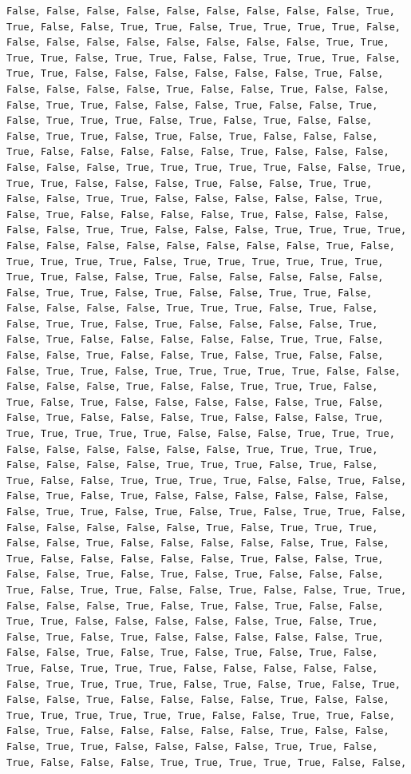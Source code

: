 \documentclass[
  letterpaper,
  DIV=11,
  numbers=noendperiod]{scrartcl}
\begin{document}
\begin{verbatim}
False, False, False, False, False, False, False, False, False, True, True, False, False, True, True, False, True, True, True, True, False, False, False, False, False, False, False, False, False, True, True, True, True, False, True, True, False, False, True, True, True, False, True, True, False, False, False, False, False, False, True, False, False, False, False, False, True, False, False, True, False, False, False, True, True, False, False, False, True, False, False, True, False, True, True, True, False, True, False, True, False, False, False, True, True, False, True, False, True, False, False, False, True, False, False, False, False, False, True, False, False, False, False, False, False, True, True, True, True, True, False, False, True, True, True, False, False, False, True, False, False, True, True, False, False, True, True, False, False, False, False, False, True, False, True, False, False, False, False, True, False, False, False, False, False, True, True, False, False, False, True, True, True, True, False, False, False, False, False, False, False, False, True, False, True, True, True, True, False, True, True, True, True, True, True, True, True, False, False, True, False, False, False, False, False, False, True, True, False, True, False, False, True, True, False, False, False, False, False, True, True, True, False, True, False, False, True, True, False, True, False, False, False, False, True, False, True, False, False, False, False, False, True, True, False, False, False, True, False, False, True, False, True, False, False, False, True, True, False, True, True, True, True, True, False, False, False, False, False, True, False, False, True, True, True, False, True, False, True, False, False, False, False, False, True, False, False, True, False, False, False, True, False, False, False, True, True, True, True, True, True, False, False, False, True, True, True, False, False, False, False, False, False, True, True, True, True, False, False, False, False, True, True, True, False, True, False, True, False, False, True, True, True, True, False, False, True, False, False, True, False, True, False, False, False, False, False, False, False, True, True, False, True, False, True, False, True, True, False, False, False, False, False, False, True, False, True, True, True, False, False, True, False, False, False, False, False, True, False, True, False, False, False, False, False, True, False, False, True, False, False, True, False, True, False, True, False, False, False, True, False, True, True, False, False, True, False, False, True, True, False, False, False, True, False, True, False, True, False, False, True, True, False, False, False, False, False, True, False, True, False, True, False, True, False, False, False, False, False, True, False, False, True, False, True, False, True, False, True, False, True, False, True, True, True, False, False, False, False, False, False, True, True, True, True, False, True, False, True, False, True, False, False, True, False, False, False, False, True, False, False, True, True, True, True, True, True, False, False, True, True, False, False, True, False, False, False, False, False, True, False, False, False, True, True, False, False, False, False, True, True, False, True, False, False, False, True, True, True, True, True, False, False, 
\end{verbatim}
\end{document}
